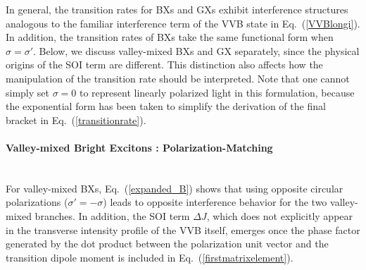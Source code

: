In general, the transition rates for BXs and GXs exhibit interference structures analogous to the familiar interference term of the VVB state in Eq.~(\ref{VVBlongi}). In addition, the transition rates of BXs take the same functional form when $\sigma=\sigma'$. Below, we discuss valley-mixed BXs and GX separately, since the physical origins of the SOI term are different. This distinction also affects how the manipulation of the transition rate should be interpreted. Note that one cannot simply set $\sigma=0$ to represent linearly polarized light in this formulation, because the exponential form has been taken to simplify the derivation of the final bracket in Eq.~(\ref{transitionrate}).

\paragraph*{Valley-mixed Bright Excitons : Polarization-Matching}~\\

For valley-mixed BXs, Eq.~(\ref{expanded_B}) shows that using opposite circular polarizations ($\sigma'=-\sigma$) leads to opposite interference behavior for the two valley-mixed branches. In addition, the SOI term $\Delta J$, which does not explicitly appear in the transverse intensity profile of the VVB itself, emerges once the phase factor generated by the dot product between the polarization unit vector and the transition dipole moment is included in Eq.~(\ref{firstmatrixelement}). 
 
